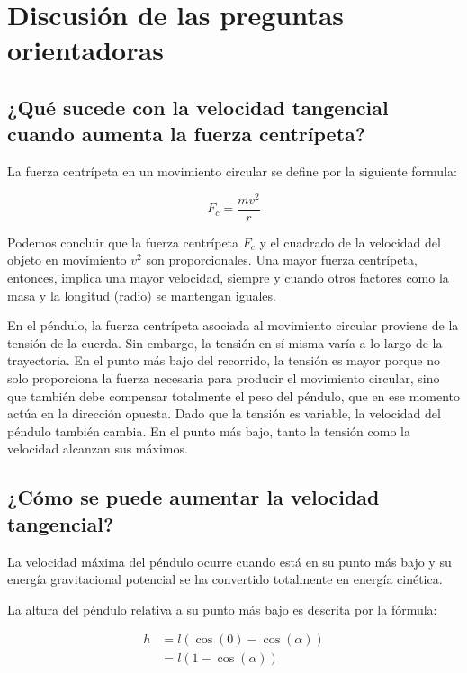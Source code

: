 \documentclass[twocolumn]{report}
\numberwithin{table}{section}
\begin{document}
\chapter{Discusión de las preguntas orientadoras}

\section{¿Qué sucede con la velocidad tangencial cuando
aumenta la fuerza centrípeta?}\label{sec:velocidad_tangencial}

La fuerza centrípeta en un movimiento circular se define por la
siguiente formula:

\begin{equation}
  F_{c} = \frac{mv^{2}}{r}
\end{equation}

Podemos concluir que la fuerza centrípeta $F_{c}$ y el cuadrado de la
velocidad del objeto en movimiento $v^{2}$ son proporcionales. Una
mayor fuerza centrípeta, entonces, implica una mayor velocidad,
siempre y cuando otros factores como la masa y la longitud (radio) se
mantengan iguales.

En el péndulo, la fuerza centrípeta asociada al movimiento circular
proviene de la tensión de la cuerda. Sin embargo, la tensión en sí
misma varía a lo largo de la trayectoria. En el punto más bajo del
recorrido, la tensión es mayor porque no solo proporciona la fuerza
necesaria para producir el movimiento circular, sino que también debe
compensar totalmente el peso del péndulo, que en ese momento actúa en
la dirección opuesta. Dado que la tensión es variable, la velocidad
del péndulo también cambia. En el punto más bajo, tanto la tensión
como la velocidad alcanzan sus máximos.

\section{¿Cómo se puede aumentar la velocidad tangencial?}

La velocidad máxima del péndulo ocurre cuando está en su punto más
bajo y su energía gravitacional potencial se ha convertido totalmente
en energía cinética.

La altura del péndulo relativa a su punto más bajo es descrita por la fórmula:

\begin{align}
  h &= l(\cos(0) - \cos(\alpha)) \nonumber \\
  &= l(1 - \cos(\alpha))
\end{align}
\end{document}
